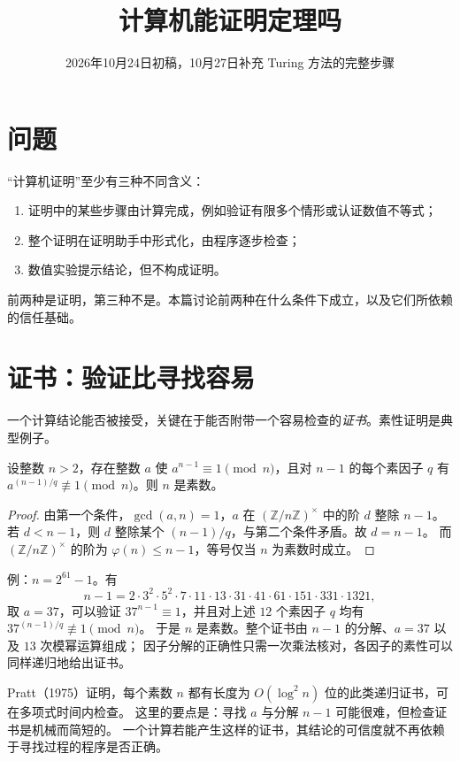 \documentclass[11pt]{article}
\date{2026年10月24日初稿，10月27日补充 Turing 方法的完整步骤}
\title{计算机能证明定理吗}
\begin{document}
\maketitle

\par\medskip

\section{问题}
“计算机证明”至少有三种不同含义：
\begin{enumerate}
 \item 证明中的某些步骤由计算完成，例如验证有限多个情形或认证数值不等式；
 \item 整个证明在证明助手中形式化，由程序逐步检查；
 \item 数值实验提示结论，但不构成证明。
\end{enumerate}
前两种是证明，第三种不是。本篇讨论前两种在什么条件下成立，以及它们所依赖的信任基础。

\section{证书：验证比寻找容易}
一个计算结论能否被接受，关键在于能否附带一个容易检查的\emph{证书}。素性证明是典型例子。
\begin{proposition}[Lucas]\label{prop:lucas}
设整数 $n>2$，存在整数 $a$ 使 $a^{n-1}\equiv1\pmod n$，且对 $n-1$ 的每个素因子 $q$ 有
$a^{(n-1)/q}\not\equiv1\pmod n$。则 $n$ 是素数。
\end{proposition}
\begin{proof}
由第一个条件，$\gcd(a,n)=1$，$a$ 在 $(\mathbb Z/n\mathbb Z)^\times$ 中的阶 $d$ 整除 $n-1$。
若 $d<n-1$，则 $d$ 整除某个 $(n-1)/q$，与第二个条件矛盾。故 $d=n-1$。
而 $(\mathbb Z/n\mathbb Z)^\times$ 的阶为 $\varphi(n)\le n-1$，等号仅当 $n$ 为素数时成立。
\end{proof}
例：$n=2^{61}-1$。有
\[
 n-1=2\cdot3^2\cdot5^2\cdot7\cdot11\cdot13\cdot31\cdot41\cdot61\cdot151\cdot331\cdot1321,
\]
取 $a=37$，可以验证 $37^{n-1}\equiv1$，并且对上述 $12$ 个素因子 $q$ 均有 $37^{(n-1)/q}\not\equiv1\pmod n$。
于是 $n$ 是素数。整个证书由 $n-1$ 的分解、$a=37$ 以及 $13$ 次模幂运算组成；
因子分解的正确性只需一次乘法核对，各因子的素性可以同样递归地给出证书。

Pratt（1975）证明，每个素数 $n$ 都有长度为 $O(\log^2n)$ 位的此类递归证书，可在多项式时间内检查。
这里的要点是：寻找 $a$ 与分解 $n-1$ 可能很难，但检查证书是机械而简短的。
一个计算若能产生这样的证书，其结论的可信度就不再依赖于寻找过程的程序是否正确。
\end{document}
